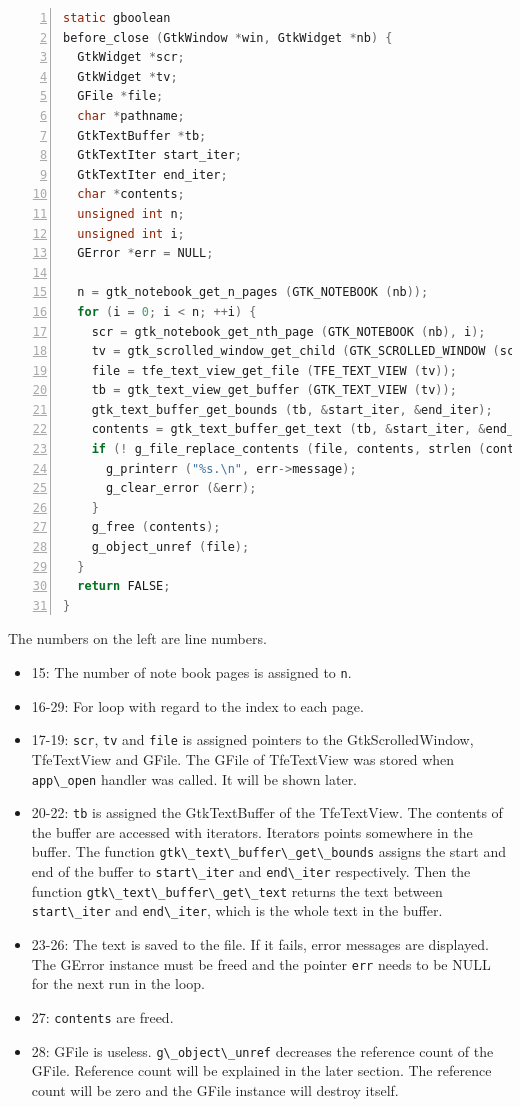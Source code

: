 \begin{lstlisting}[language=C, numbers=left]
static gboolean
before_close (GtkWindow *win, GtkWidget *nb) {
  GtkWidget *scr;
  GtkWidget *tv;
  GFile *file;
  char *pathname;
  GtkTextBuffer *tb;
  GtkTextIter start_iter;
  GtkTextIter end_iter;
  char *contents;
  unsigned int n;
  unsigned int i;
  GError *err = NULL;

  n = gtk_notebook_get_n_pages (GTK_NOTEBOOK (nb));
  for (i = 0; i < n; ++i) {
    scr = gtk_notebook_get_nth_page (GTK_NOTEBOOK (nb), i);
    tv = gtk_scrolled_window_get_child (GTK_SCROLLED_WINDOW (scr));
    file = tfe_text_view_get_file (TFE_TEXT_VIEW (tv));
    tb = gtk_text_view_get_buffer (GTK_TEXT_VIEW (tv));
    gtk_text_buffer_get_bounds (tb, &start_iter, &end_iter);
    contents = gtk_text_buffer_get_text (tb, &start_iter, &end_iter, FALSE);
    if (! g_file_replace_contents (file, contents, strlen (contents), NULL, TRUE, G_FILE_CREATE_NONE, NULL, NULL, &err)) {
      g_printerr ("%s.\n", err->message);
      g_clear_error (&err);
    }
    g_free (contents);
    g_object_unref (file);
  }
  return FALSE;
}
\end{lstlisting}

The numbers on the left are line numbers.

\begin{itemize}
\tightlist
\item
  15: The number of note book pages is assigned to
  \passthrough{\lstinline!n!}.
\item
  16-29: For loop with regard to the index to each page.
\item
  17-19: \passthrough{\lstinline!scr!}, \passthrough{\lstinline!tv!} and
  \passthrough{\lstinline!file!} is assigned pointers to the
  GtkScrolledWindow, TfeTextView and GFile. The GFile of TfeTextView was
  stored when \passthrough{\lstinline!app\_open!} handler was called. It
  will be shown later.
\item
  20-22: \passthrough{\lstinline!tb!} is assigned the GtkTextBuffer of
  the TfeTextView. The contents of the buffer are accessed with
  iterators. Iterators points somewhere in the buffer. The function
  \passthrough{\lstinline!gtk\_text\_buffer\_get\_bounds!} assigns the
  start and end of the buffer to \passthrough{\lstinline!start\_iter!}
  and \passthrough{\lstinline!end\_iter!} respectively. Then the
  function \passthrough{\lstinline!gtk\_text\_buffer\_get\_text!}
  returns the text between \passthrough{\lstinline!start\_iter!} and
  \passthrough{\lstinline!end\_iter!}, which is the whole text in the
  buffer.
\item
  23-26: The text is saved to the file. If it fails, error messages are
  displayed. The GError instance must be freed and the pointer
  \passthrough{\lstinline!err!} needs to be NULL for the next run in the
  loop.
\item
  27: \passthrough{\lstinline!contents!} are freed.
\item
  28: GFile is useless. \passthrough{\lstinline!g\_object\_unref!}
  decreases the reference count of the GFile. Reference count will be
  explained in the later section. The reference count will be zero and
  the GFile instance will destroy itself.
\end{itemize}

